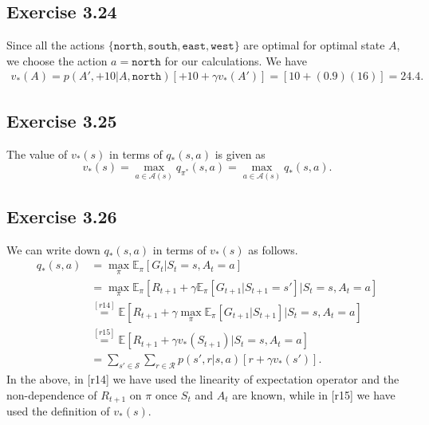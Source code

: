 \documentclass[10pt]{article}
\begin{document}
	 \subsection*{Exercise 3.24}
	 \label{ss:3.24}
	 Since all the actions $\{ \texttt{north},\texttt{south},\texttt{east},\texttt{west} \}$ are optimal for optimal state $A$, we choose the action $a = \texttt{north}$ for our calculations. We have
	 \begin{align*}
	 v_*(A) = p(A',+10|A,\texttt{north}) \left[ +10 + \gamma v_*(A') \right] = \left[ 10 + (0.9)(16) \right] = 24.4. 
	 \end{align*}
	 \subsection*{Exercise 3.25}
	 \label{ss:3.25}
	 The value of $v_*(s)$ in terms of $q_*(s,a)$ is given as
	 \begin{equation*}
	 v_*(s) = \max\limits_{a\in\mathcal{A}(s)} q_{\pi^*}(s,a) = \max\limits_{a\in\mathcal{A}(s)} q_{*}(s,a).
	 \end{equation*}
	 \subsection*{Exercise 3.26}
	 \label{ss:3.26}
	 We can write down $q_*(s,a)$ in terms of $v_*(s)$ as follows.
	 \begin{align*}
	 q_*(s,a) &= \max\limits_\pi \mathbb{E}_\pi \left[ G_t | S_t = s, A_t = a\right]\\
	 &= \max\limits_\pi \mathbb{E}_\pi \left[ R_{t+1} + \gamma \mathbb{E}_\pi \left[ G_{t+1} | S_{t+1} = s' \right] | S_t = s, A_t = a\right]\\
	 &\stackrel{[r14]}{=} \mathbb{E} \left[ R_{t+1} + \gamma \max\limits_\pi \mathbb{E}_\pi \left[ G_{t+1} | S_{t+1} \right] | S_t = s, A_t = a\right]\\
	 &\stackrel{[r15]}{=} \mathbb{E} \left[ R_{t+1} + \gamma v_*(S_{t+1}) | S_t = s, A_t = a\right]\\
	 &= \sum_{s'\in\mathcal{S}} \sum_{r\in\mathcal{R}} p(s',r|s,a) \left[ r + \gamma v_*(s') \right].
	 \end{align*}
	 In the above, in [r14] we have used the linearity of expectation operator and the non-dependence of $R_{t+1}$ on $\pi$ once $S_t$ and $A_t$ are known, while in [r15] we have used the definition of $v_*(s)$.
\end{document}
